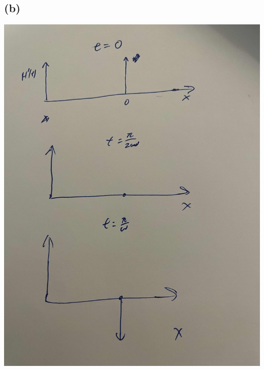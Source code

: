 \documentclass[11pt]{article}
\begin{document}
\subsection*{(b)}
\includegraphics*[scale=0.1]{fig1.png}\\
\end{document}
